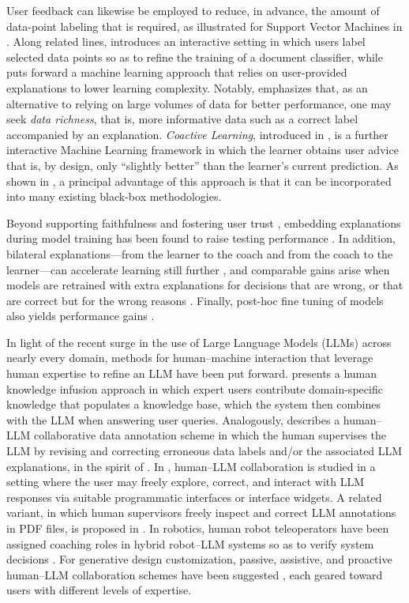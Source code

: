 \documentclass[runningheads]{llncs}
\begin{document}
User feedback can likewise be employed to reduce, in advance, the amount of data-point labeling that is required, as illustrated for Support Vector Machines in \cite{raghavanAllan2007}. Along related lines, \cite{settles-2011-closing} introduces an interactive setting in which users label selected data points so as to refine the training of a document classifier, while \cite{zaidan2007using} puts forward a machine learning approach that relies on user-provided explanations to lower learning complexity. Notably, \cite{zaidan2007using} emphasizes that, as an alternative to relying on large volumes of data for better performance, one may seek \emph{data richness}, that is, more informative data such as a correct label accompanied by an explanation. \emph{Coactive Learning}, introduced in \cite{shivaswamyJoachims2015}, is a further interactive Machine Learning framework in which the learner obtains user advice that is, by design, only ``slightly better'' than the learner's current prediction. As shown in \cite{shivaswamyJoachims2015}, a principal advantage of this approach is that it can be incorporated into many existing black-box methodologies.

Beyond supporting faithfulness and fostering user trust \cite{BARREDOARRIETA202082}, embedding explanations during model training has been found to raise testing performance \cite{Selvaraju_2019}. In addition, bilateral explanations---from the learner to the coach and from the coach to the learner---can accelerate learning still further \cite{dongSu2017}, and comparable gains arise when models are retrained with extra explanations for decisions that are wrong, or that are correct but for the wrong reasons \cite{riegerSingh2019}. Finally, post-hoc fine tuning of models also yields performance gains \cite{ribeiro2016}.

In light of the recent surge in the use of Large Language Models (LLMs) across nearly every domain, methods for human--machine interaction that leverage human expertise to refine an LLM have been put forward. \cite{welz2024} presents a human knowledge infusion approach in which expert users contribute domain-specific knowledge that populates a knowledge base, which the system then combines with the LLM when answering user queries. Analogously, \cite{wang2024} describes a human--LLM collaborative data annotation scheme in which the human supervises the LLM by revising and correcting erroneous data labels and/or the associated LLM explanations, in the spirit of \cite{tesoKerstingIML2019}. In \cite{kim2024megannohumanllmcollaborativeannotation}, human--LLM collaboration is studied in a setting where the user may freely explore, correct, and interact with LLM responses via suitable programmatic interfaces or interface widgets. A related variant, in which human supervisors freely inspect and correct LLM annotations in PDF files, is proposed in \cite{tang2024}. In robotics, human robot teleoperators have been assigned coaching roles in hybrid robot--LLM systems so as to verify system decisions \cite{liu2023llmbasedhumanrobotcollaborationframework}. For generative design customization, passive, assistive, and proactive human--LLM collaboration schemes have been suggested \cite{WANG2025425}, each geared toward users with different levels of expertise.
\end{document}
